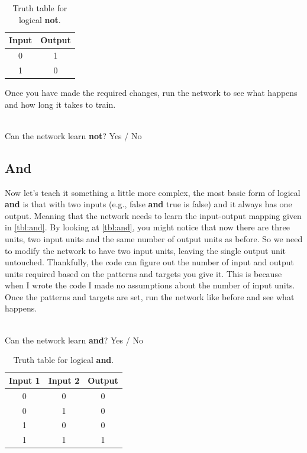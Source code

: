 \documentclass[a4paper,10pt]{article}
\begin{document}
\begin{table}[hb]
 \centering
 \begin{tabular}[t]{cc}
Input & Output\\ \hline
0 & 1\\
1 & 0
\end{tabular} \caption{Truth table for logical \textbf{not}.}
 \label{tbl:not}
\end{table}

Once you have made the required changes, run the network to see what happens and how long it takes to train. 

\ \\ Can the network learn \textbf{not}?    Yes / No                                               
                                                     

\subsection{And}

Now let's teach it something a little more complex, the most basic form of logical \textbf{and} is that with two inputs (e.g., false \textbf{and} true is false) and it always has one output. Meaning that the network needs to learn the input-output mapping given in \autoref{tbl:and}. By looking at \autoref{tbl:and}, you might notice that now there are three units, two input units and the same number of output units as before. So we need to modify the network to have two input units, leaving the single output unit untouched. Thankfully, the code can figure out the number of input and output units required based on the patterns and targets you give it. This is because when I wrote the code I made no assumptions about the number of input units.
Once the patterns and targets are set, run the network like before and see what happens.

\ \\ Can the network learn \textbf{and}?    Yes / No                                             

\begin{table}[ht]
 \centering
 \begin{tabular}[t]{ccc}
Input 1 & Input 2 & Output\\ \hline
0 & 0 & 0\\
0 & 1 & 0 \\
1 & 0 & 0 \\
1 & 1 & 1 \\

\end{tabular} \caption{Truth table for logical \textbf{and}.}
 \label{tbl:and}
\end{table}
\end{document}
